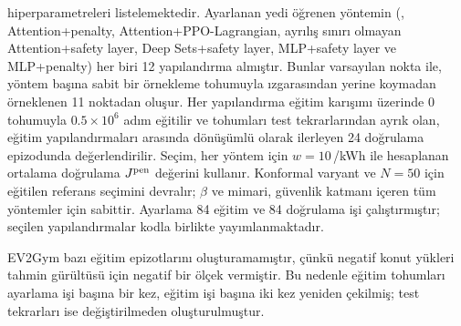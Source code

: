  hiperparametreleri listelemektedir.
Ayarlanan yedi öğrenen yöntemin (\method{}, Attention+penalty, Attention+PPO-Lagrangian, ayrılış sınırı olmayan Attention+safety layer, Deep Sets+\allowbreak safety layer, MLP+\allowbreak safety layer ve MLP+\allowbreak penalty) her biri 12 yapılandırma almıştır.
Bunlar varsayılan nokta ile, yöntem başına sabit bir örnekleme tohumuyla  ızgarasından yerine koymadan örneklenen 11 noktadan oluşur.
Her yapılandırma eğitim karışımı üzerinde 0 tohumuyla $0.5\times10^{6}$ adım eğitilir ve tohumları test tekrarlarından ayrık olan, eğitim yapılandırmaları arasında dönüşümlü olarak ilerleyen 24 doğrulama epizodunda değerlendirilir.
Seçim, her yöntem için $w=10$\,\texteuro/kWh ile hesaplanan ortalama doğrulama $J^{\mathrm{pen}}$ değerini kullanır.
Konformal varyant ve $N=50$ için eğitilen referans \method{} seçimini devralır; $\beta$ ve mimari, güvenlik katmanı içeren tüm yöntemler için sabittir.
Ayarlama 84 eğitim ve 84 doğrulama işi çalıştırmıştır; seçilen yapılandırmalar kodla birlikte yayımlanmaktadır.

EV2Gym bazı eğitim epizotlarını oluşturamamıştır, çünkü negatif konut yükleri tahmin gürültüsü için negatif bir ölçek vermiştir.
Bu nedenle eğitim tohumları ayarlama işi başına bir kez, eğitim işi başına iki kez yeniden çekilmiş; test tekrarları ise değiştirilmeden oluşturulmuştur.


